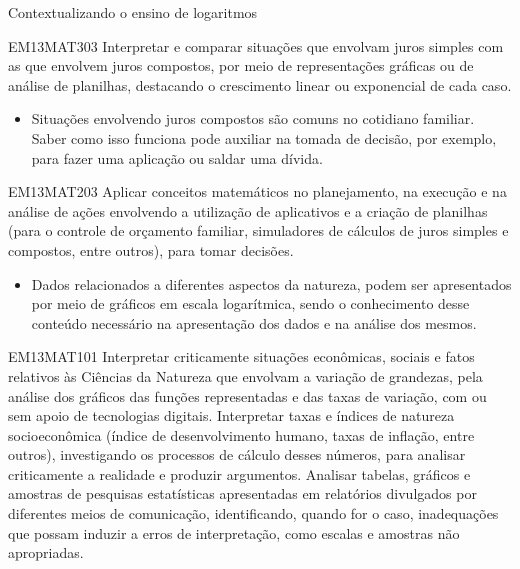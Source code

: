 \begin{apresentacao}{Contextualizando o ensino de logaritmos}
\begin{habilities}{EM13MAT303}
Interpretar e comparar situações que envolvam juros simples com as que envolvem juros compostos, por meio de representações gráficas ou de análise de planilhas, destacando o crescimento linear ou exponencial de cada caso.
\end{habilities}


\columnbreak
\begin{itemize}
\item Situações envolvendo juros compostos são comuns no cotidiano familiar. Saber como isso funciona pode auxiliar na tomada de decisão, por exemplo, para fazer uma aplicação ou saldar uma dívida.
\end{itemize}

\begin{habilities}{EM13MAT203}
Aplicar conceitos matemáticos no planejamento, na execução e na análise de ações envolvendo a utilização de aplicativos e a criação de planilhas (para o controle de orçamento familiar, simuladores de cálculos de juros simples e compostos, entre outros), para tomar decisões.
\end{habilities}

\begin{itemize}
\item Dados relacionados a diferentes aspectos da natureza, podem ser apresentados por meio de gráficos em escala logarítmica, sendo o conhecimento desse conteúdo necessário na apresentação dos dados e na análise dos mesmos.
\end{itemize}

\begin{habilities}{EM13MAT101}
Interpretar criticamente situações econômicas, sociais e fatos relativos às Ciências da Natureza que envolvam a variação de grandezas, pela análise dos gráficos das funções representadas e das taxas de variação, com ou sem apoio de tecnologias digitais.
Interpretar taxas e índices de natureza socioeconômica (índice de desenvolvimento humano, taxas de inflação, entre outros), investigando os processos de cálculo desses números, para analisar criticamente a realidade e produzir argumentos.
 Analisar tabelas, gráficos e amostras de pesquisas estatísticas apresentadas em relatórios divulgados por diferentes meios de comunicação, identificando, quando for o caso, inadequações que possam induzir a erros de interpretação, como escalas e amostras não apropriadas.
\end{habilities}




\end{apresentacao}
